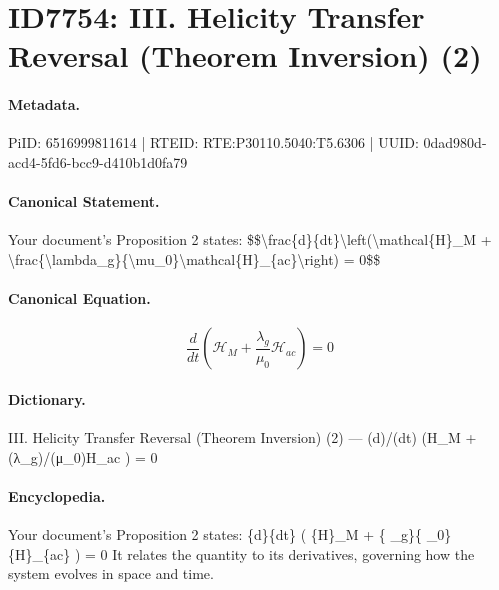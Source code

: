 \section*{ID7754: III. Helicity Transfer Reversal (Theorem Inversion) (2)}
\paragraph{Metadata.}
PiID: 6516999811614 | RTEID: RTE:P30110.5040:T5.6306 | UUID: 0dad980d-acd4-5fd6-bcc9-d410b1d0fa79

\paragraph{Canonical Statement.}
Your document's Proposition 2 states: \$\$\textbackslash{}frac\{d\}\{dt\}\textbackslash{}left(\textbackslash{}mathcal\{H\}\_M + \textbackslash{}frac\{\textbackslash{}lambda\_g\}\{\textbackslash{}mu\_0\}\textbackslash{}mathcal\{H\}\_\{ac\}\textbackslash{}right) = 0\$\$

\paragraph{Canonical Equation.}
\[
\frac{d}{dt}\left(\mathcal{H}_M + \frac{\lambda_g}{\mu_0}\mathcal{H}_{ac}\right) = 0
\]

\paragraph{Dictionary.}
III. Helicity Transfer Reversal (Theorem Inversion) (2) — (d)/(dt) (H\_M + (λ\_g)/(μ\_0)H\_ac ) = 0

\paragraph{Encyclopedia.}
Your document's Proposition 2 states: \{d\}\{dt\} ( \{H\}\_M + \{ \_g\}\{ \_0\} \{H\}\_\{ac\} ) = 0 It relates the quantity to its derivatives, governing how the system evolves in space and time.
